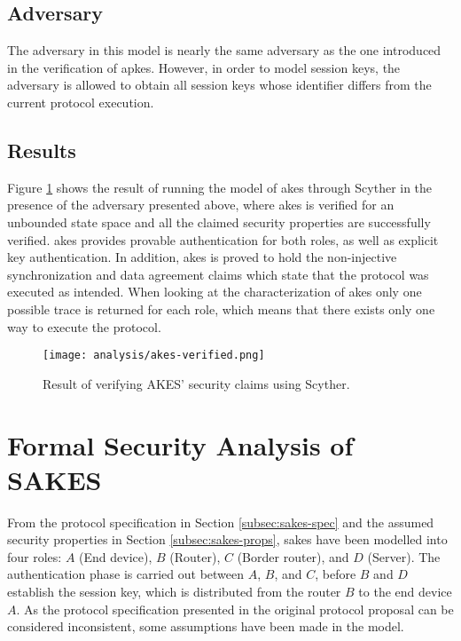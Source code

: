 \subsection{Adversary}

The adversary in this model is nearly the same adversary as the one introduced in the verification of \gls{apkes}. However, in order to model session keys, the adversary is allowed to obtain all session keys whose identifier differs from the current protocol execution. 

\subsection{Results}

Figure \ref{fig:akes-verified} shows the result of running the model of \gls{akes} through Scyther in the presence of the adversary presented above, where \gls{akes} is verified for an unbounded state space and all the claimed security properties are successfully verified. \gls{akes} provides provable authentication for both roles, as well as explicit key authentication. In addition, \gls{akes} is proved to hold the non-injective synchronization and data agreement claims which state that the protocol was executed as intended. When looking at the characterization of \gls{akes} only one possible trace is returned for each role, which means that there exists only one way to execute the protocol.

\begin{figure}[h]
	\centering
	\texttt{[image: analysis/akes-verified.png]}
	\caption{Result of verifying AKES' security claims using Scyther.}
	\label{fig:akes-verified}
\end{figure}


\section{Formal Security Analysis of SAKES}
\label{sec:sakes-analysis}

From the protocol specification in Section \ref{subsec:sakes-spec} and the assumed security properties in Section \ref{subsec:sakes-props}, \gls{sakes} have been modelled into four roles: $A$ (End device), $B$ (Router), $C$ (Border router), and $D$ (Server). The authentication phase is carried out between $A$, $B$, and $C$, before $B$ and $D$ establish the session key, which is distributed from the router $B$ to the end device $A$. As the protocol specification presented in the original protocol proposal can be considered inconsistent, some assumptions have been made in the model.

